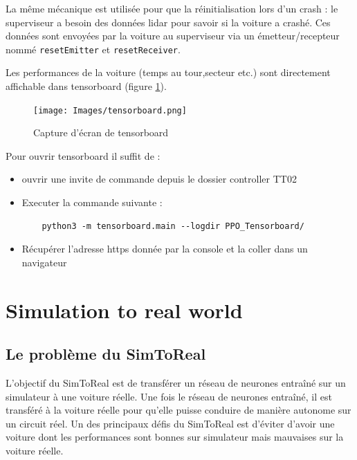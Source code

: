 \documentclass[french]{article}
\begin{document}
\vspace{0.5cm}

La même mécanique est utilisée pour que la réinitialisation lors d'un crash : le superviseur a besoin des données lidar pour savoir si la voiture a crashé. Ces données sont envoyées par la voiture au superviseur via un émetteur/recepteur nommé \verb|resetEmitter| et \verb|resetReceiver|.

\vspace{0.5cm}

Les performances de la voiture (temps au tour,secteur etc.) sont directement affichable dans tensorboard (figure \ref{fig:tensorboard}).

\begin{figure}[H]
    \centering
    \texttt{[image: Images/tensorboard.png]}
    \caption{Capture d'écran de tensorboard}
    \label{fig:tensorboard}
\end{figure}

Pour ouvrir tensorboard il suffit de :
\begin{itemize}
    \item ouvrir une invite de commande depuis le dossier controller TT02
    \item Executer la commande suivante :
    \begin{verbatim}
    python3 -m tensorboard.main --logdir PPO_Tensorboard/
    \end{verbatim}
    \item Récupérer l'adresse https donnée par la console et la coller dans un navigateur
\end{itemize}


\section{Simulation to real world}

\subsection{Le problème du SimToReal}

L'objectif du SimToReal est de transférer un réseau de neurones entraîné sur un simulateur à une voiture réelle. 
Une fois le réseau de neurones entraîné, il est transféré à la voiture réelle pour qu'elle puisse conduire de manière autonome sur un circuit réel. Un des principaux défis du SimToReal est d'éviter d'avoir une voiture dont les performances sont bonnes sur simulateur mais mauvaises sur la voiture réelle.
\end{document}
